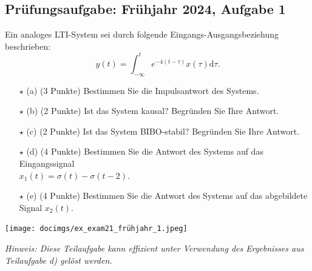 \documentclass[11pt]{article}
\begin{document}
\subsection*{Prüfungsaufgabe: Frühjahr 2024, Aufgabe 1}
\vspace*{-0.5cm}
Ein analoges LTI-System sei durch folgende Eingangs-Ausgangsbeziehung beschrieben:
$$y(t) = \int_{-\infty}^t e^{-4(t-\tau)}x(\tau)\text{d}\tau.$$
\begin{itemize}
    \item[$\star$ (a)] (3 Punkte) Bestimmen Sie die Impulsantwort des Systems.
    \item[$\star$ (b)] (2 Punkte) Ist das System kausal? Begründen Sie Ihre Antwort.
    \item[$\star$ (c)] (2 Punkte) Ist das System BIBO-stabil? Begründen Sie Ihre Antwort.
    \item[$\star$ (d)] (4 Punkte) Bestimmen Sie die Antwort des Systems auf das Eingangssignal \\$x_1(t) = \sigma(t) - \sigma(t-2).$
    \item[$\star$ (e)] (4 Punkte) Bestimmen Sie die Antwort des Systems auf das abgebildete Signal $x_2(t).$
\end{itemize}
\vspace*{-1cm}
\begin{center}
    \texttt{[image: docimgs/ex\_exam21\_frühjahr\_1.jpeg]}
\end{center}
\vspace*{-0.5cm}
\textit{Hinweis: Diese Teilaufgabe kann effizient unter Verwendung des Ergebnisses aus Teilaufgabe d) gelöst werden.}


\pagebreak

\end{document}
